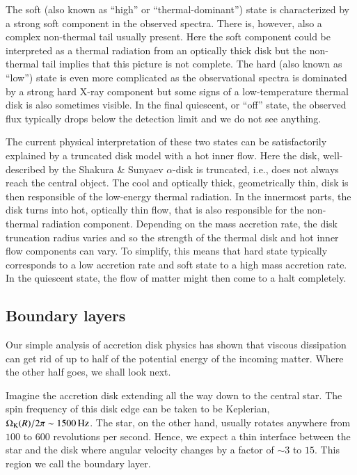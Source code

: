 The soft (also known as ``high'' or ``thermal-dominant'') state is characterized by a strong soft component in the observed spectra.\cite[see e.g.,][]{GZP99}
There is, however, also a complex non-thermal tail usually present.\cite{MRC00}
Here the soft component could be interpreted as a thermal radiation from an optically thick disk but the non-thermal tail implies that this picture is not complete.
The hard (also known as ``low'') state is even more complicated as the observational spectra is dominated by a strong hard X-ray component but some signs of a low-temperature thermal disk is also sometimes visible.\cite{ZG04}
In the final quiescent, or ``off'' state, the observed flux typically drops below the detection limit and we do not see anything.


The current physical interpretation of these two states can be satisfactorily explained by a truncated disk model with a hot inner flow.
Here the disk, well-described by the Shakura \& Sunyaev $\alpha$-disk is truncated, i.e., does not always reach the central object.
The cool and optically thick, geometrically thin, disk is then responsible of the low-energy thermal radiation.
In the innermost parts, the disk turns into hot, optically thin flow, that is also responsible for the non-thermal radiation component.
Depending on the mass accretion rate, the disk truncation radius varies and so the strength of the thermal disk and hot inner flow components can vary.
To simplify, this means that hard state typically corresponds to a low accretion rate and soft state to a high mass accretion rate.
In the quiescent state, the flow of matter might then come to a halt completely.


\subsection{Boundary layers}

Our simple analysis of accretion disk physics has shown that viscous dissipation can get rid of up to half of the potential energy of the incoming matter.
Where the other half goes, we shall look next.

Imagine the accretion disk extending all the way down to the central star.
The spin frequency of this disk edge can be taken to be Keplerian, $\Omega_{\mathrm{K}}(R)/2\pi \sim 1500 \,\mathrm{Hz}$.
The star, on the other hand, usually rotates anywhere from $100$ to $600$ revolutions per second.\cite{Watts12, PTR14}
Hence, we expect a thin interface between the star and the disk where angular velocity changes by a factor of $\sim 3$ to $15$.
This region we call the boundary layer.

